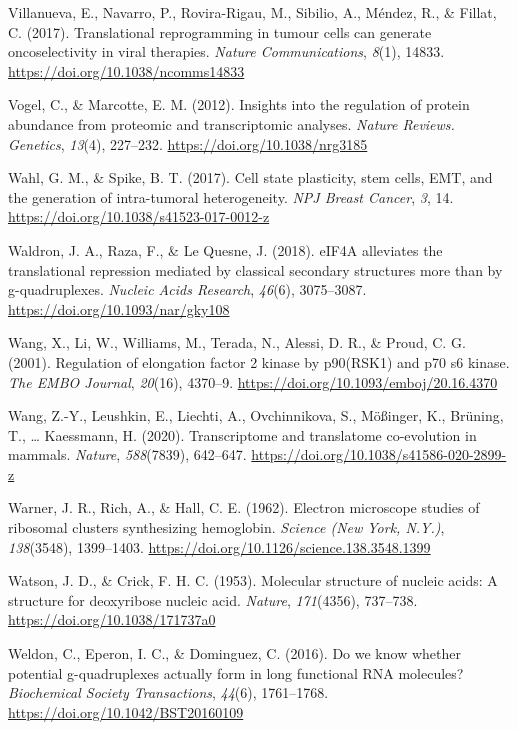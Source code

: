 \documentclass[12pt,openany]{book}
\begin{document}
\hypertarget{ref-Villanueva2017}{}
Villanueva, E., Navarro, P., Rovira-Rigau, M., Sibilio, A., Méndez, R.,
\& Fillat, C. (2017). Translational reprogramming in tumour cells can
generate oncoselectivity in viral therapies. \emph{Nature
Communications}, \emph{8}(1), 14833.
\url{https://doi.org/10.1038/ncomms14833}

\hypertarget{ref-Vogel2012}{}
Vogel, C., \& Marcotte, E. M. (2012). Insights into the regulation of
protein abundance from proteomic and transcriptomic analyses.
\emph{Nature Reviews. Genetics}, \emph{13}(4), 227--232.
\url{https://doi.org/10.1038/nrg3185}

\hypertarget{ref-Wahl2017}{}
Wahl, G. M., \& Spike, B. T. (2017). Cell state plasticity, stem cells,
EMT, and the generation of intra-tumoral heterogeneity. \emph{NPJ Breast
Cancer}, \emph{3}, 14. \url{https://doi.org/10.1038/s41523-017-0012-z}

\hypertarget{ref-Waldron2018}{}
Waldron, J. A., Raza, F., \& Le Quesne, J. (2018). eIF4A alleviates the
translational repression mediated by classical secondary structures more
than by g-quadruplexes. \emph{Nucleic Acids Research}, \emph{46}(6),
3075--3087. \url{https://doi.org/10.1093/nar/gky108}

\hypertarget{ref-Wang2001}{}
Wang, X., Li, W., Williams, M., Terada, N., Alessi, D. R., \& Proud, C.
G. (2001). Regulation of elongation factor 2 kinase by p90(RSK1) and p70
s6 kinase. \emph{The EMBO Journal}, \emph{20}(16), 4370--9.
\url{https://doi.org/10.1093/emboj/20.16.4370}

\hypertarget{ref-Wang2020}{}
Wang, Z.-Y., Leushkin, E., Liechti, A., Ovchinnikova, S., Mößinger, K.,
Brüning, T., \ldots{} Kaessmann, H. (2020). Transcriptome and
translatome co-evolution in mammals. \emph{Nature}, \emph{588}(7839),
642--647. \url{https://doi.org/10.1038/s41586-020-2899-z}

\hypertarget{ref-Warner1962}{}
Warner, J. R., Rich, A., \& Hall, C. E. (1962). Electron microscope
studies of ribosomal clusters synthesizing hemoglobin. \emph{Science
(New York, N.Y.)}, \emph{138}(3548), 1399--1403.
\url{https://doi.org/10.1126/science.138.3548.1399}

\hypertarget{ref-Watson1953}{}
Watson, J. D., \& Crick, F. H. C. (1953). Molecular structure of nucleic
acids: A structure for deoxyribose nucleic acid. \emph{Nature},
\emph{171}(4356), 737--738. \url{https://doi.org/10.1038/171737a0}

\hypertarget{ref-Weldon2016}{}
Weldon, C., Eperon, I. C., \& Dominguez, C. (2016). Do we know whether
potential g-quadruplexes actually form in long functional RNA molecules?
\emph{Biochemical Society Transactions}, \emph{44}(6), 1761--1768.
\url{https://doi.org/10.1042/BST20160109}
\end{document}
